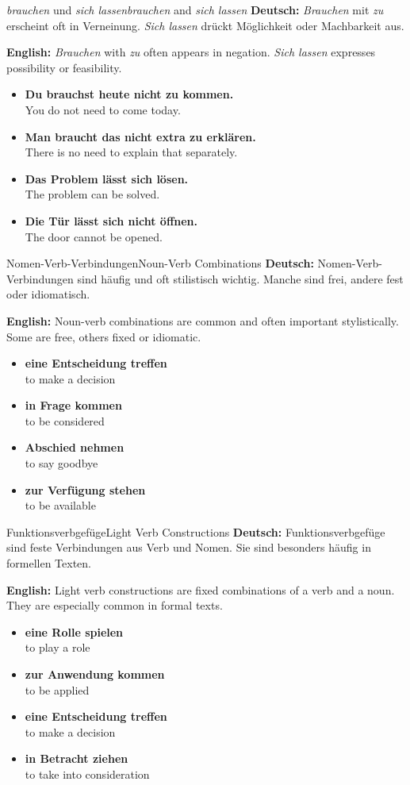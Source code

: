 \documentclass[a4paper,11pt]{article}
\newcommand{\GermanText}[1]{\textbf{Deutsch: }#1\par}
\newcommand{\EnglishText}[1]{{\color{SoftGray}\textbf{English: }#1\par}}
\newcommand{\ExampleItem}[2]{\item \textbf{#1}\\{\color{SoftGray}#2}}
\begin{document}
\begin{grammarentry}{\textit{brauchen} und \textit{sich lassen}}{\textit{brauchen} and \textit{sich lassen}}
    \GermanText{\textit{Brauchen} mit \textit{zu} erscheint oft in Verneinung. \textit{Sich lassen} drückt Möglichkeit oder Machbarkeit aus.}
    \EnglishText{\textit{Brauchen} with \textit{zu} often appears in negation. \textit{Sich lassen} expresses possibility or feasibility.}
    \begin{exbox}
        \begin{itemize}
            \ExampleItem{Du brauchst heute nicht zu kommen.}{You do not need to come today.}
            \ExampleItem{Man braucht das nicht extra zu erklären.}{There is no need to explain that separately.}
            \ExampleItem{Das Problem lässt sich lösen.}{The problem can be solved.}
            \ExampleItem{Die Tür lässt sich nicht öffnen.}{The door cannot be opened.}
        \end{itemize}
    \end{exbox}
\end{grammarentry}

\begin{grammarentry}{Nomen-Verb-Verbindungen}{Noun-Verb Combinations}
    \GermanText{Nomen-Verb-Verbindungen sind häufig und oft stilistisch wichtig. Manche sind frei, andere fest oder idiomatisch.}
    \EnglishText{Noun-verb combinations are common and often important stylistically. Some are free, others fixed or idiomatic.}
    \begin{exbox}
        \begin{itemize}
            \ExampleItem{eine Entscheidung treffen}{to make a decision}
            \ExampleItem{in Frage kommen}{to be considered}
            \ExampleItem{Abschied nehmen}{to say goodbye}
            \ExampleItem{zur Verfügung stehen}{to be available}
        \end{itemize}
    \end{exbox}
\end{grammarentry}

\begin{grammarentry}{Funktionsverbgefüge}{Light Verb Constructions}
    \GermanText{Funktionsverbgefüge sind feste Verbindungen aus Verb und Nomen. Sie sind besonders häufig in formellen Texten.}
    \EnglishText{Light verb constructions are fixed combinations of a verb and a noun. They are especially common in formal texts.}
    \begin{exbox}
        \begin{itemize}
            \ExampleItem{eine Rolle spielen}{to play a role}
            \ExampleItem{zur Anwendung kommen}{to be applied}
            \ExampleItem{eine Entscheidung treffen}{to make a decision}
            \ExampleItem{in Betracht ziehen}{to take into consideration}
        \end{itemize}
    \end{exbox}
\end{grammarentry}
\end{document}
